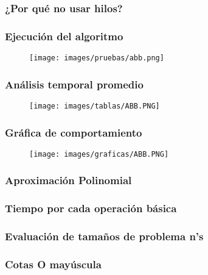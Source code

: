 \documentclass[12pt]{article}
\begin{document}
			\subsubsection{¿Por qué no usar hilos?}
			
			\subsubsection{Ejecución del algoritmo}
				\begin{figure}[H]
			    	   \centering
			    	   \texttt{[image: images/pruebas/abb.png]}
			    \end{figure}

			\subsubsection{Análisis temporal promedio}
				\begin{figure}[H]
			    	   \centering
			    	   \texttt{[image: images/tablas/ABB.PNG]}
			    \end{figure}
			
			\subsubsection{Gráfica de comportamiento}
				\begin{figure}[H]
			    	   \centering
			    	   \texttt{[image: images/graficas/ABB.PNG]}
			    \end{figure}
			
			\subsubsection{Aproximación Polinomial}
			
			\subsubsection{Tiempo por cada operación básica}
			
			\subsubsection{Evaluación de tamaños de problema n's}
			
			\subsubsection{Cotas O mayúscula}
			
\end{document}
